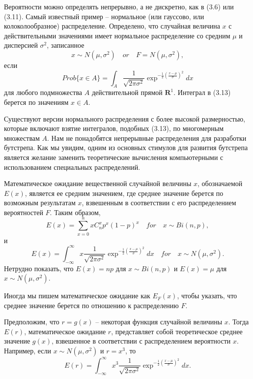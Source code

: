Вероятности можно определять непрерывно, а не дискретно, как в (3.6) или (3.11). Самый известный пример -- нормальное (или гауссово, или колоколообразное) распределение. Определено, что случайная величина $x$ с действительными значениями имеет нормальное распределение со средним $\mu$ и дисперсией $\sigma^2$, записанное 
\begin{equation}
    x\sim N(\mu,\sigma^2)\quad or \quad F=N(\mu,\sigma^2),
\end{equation}
если
\begin{equation}
    Prob\{x\in A\}=\int_A\frac{1}{\sqrt{2\pi\sigma^2}}\exp^{-\frac{1}{2}(\frac{x-\mu}{\sigma})^2}dx
\end{equation}
для любого подмножества $A$ действительной прямой $\mathbf{R}^1$. Интеграл в (3.13) берется по значениям $x \in A$. 

Существуют версии нормального распределения с более высокой размерностью, которые включают взятие интегралов, подобных (3.13), по многомерным множествам $A$. Нам не понадобятся непрерывные распределения для разработки бутстрепа. Как мы увидим, одним из основных стимулов для развития бутстрепа является желание заменить теоретические вычисления компьютерными с использованием специальных распределений. 

Математическое ожидание вещественной случайной величины $x$, обозначаемой $E(x)$, является ее средним значением, где среднее значение берется по возможным результатам $x$, взвешенным в соответствии с его распределением вероятностей $F$. Таким образом, 
\begin{equation}
    E(x)=\sum_{x=0}^nxC_n^xp^x(1-p)^x\quad for\quad x\sim Bi(n,p),
\end{equation}
и
\begin{equation}
    E(x)=\int_{-\infty}^\infty x\frac{1}{\sqrt{2\pi\sigma^2}}\exp^{-\frac{1}{2}(\frac{x-\mu}{\sigma})^2}dx\quad for \quad x\sim N(\mu,\sigma^2).
\end{equation}
Нетрудно показать, что $E(x) = np$ для $x \sim Bi (n, p)$ и $E (x) = \mu$ для $x \sim N (\mu, \sigma^2)$.

Иногда мы пишем математическое ожидание как $E_F (x)$, чтобы указать, что среднее значение берется по отношению к распределению $F$.

Предположим, что $r = g (x)$ -- некоторая функция случайной величины $x$. Тогда $E (r)$, математическое ожидание $r$, представляет собой теоретическое среднее значение $g (x)$, взвешенное в соответствии с распределением вероятности $x$. Например, если $x \sim  N (\mu, \sigma^2)$ и $r = x^3$, то 
\begin{equation}
    E(r)=\int_{-\infty}^\infty x^3\frac{1}{\sqrt{2\pi\sigma^2}}\exp^{-\frac{1}{2}(\frac{x-\mu}{\sigma})^2}dx.
\end{equation}

